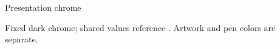 \begin{standardframe}{Presentation chrome}

\par{\small Fixed dark chrome; shared values reference . Artwork and pen colors are separate.}
\end{standardframe}
